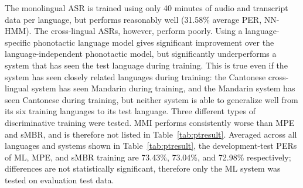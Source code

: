 The monolingual ASR is trained using only 40 minutes of audio and
transcript data per language, but performs reasonably well (31.58\%
average PER, NN-HMM).  The cross-lingual ASRs, however, perform poorly.
Using a language-specific phonotactic language model gives
significant improvement over the language-independent phonotactic
model, but significantly underperforms a system that
has seen the test language during training.  This is true
even if the system has seen closely related languages during training:
the Cantonese cross-lingual system has seen Mandarin during training,
and the Mandarin system has seen Cantonese during training, but
neither system is able to generalize well from its six training languages to
its test language.
{\color{blue} Three different types of discriminative training were tested.
 MMI performs consistently worse than MPE and sMBR,
 and is therefore not listed in Table~\ref{tab:ptresult}.
 Averaged across all languages and systems shown in Table~\ref{tab:ptresult},
 the development-test PERs of ML, MPE, and sMBR training are
 73.43\%, 73.04\%, and 72.98\% respectively; differences are not
 statistically significant, therefore only the ML system was tested on
 evaluation test data.}

